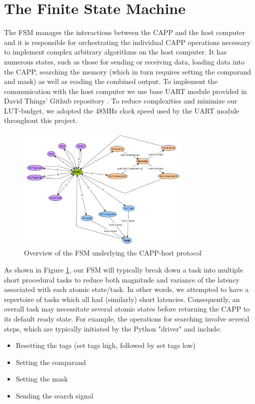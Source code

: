 \section{The Finite State Machine}
The FSM manages the interactions between the CAPP and the host computer and it is responsible for orchestrating the individual CAPP operations necessary to implement complex arbitrary algorithms on the host computer.
It has numerous states, such as those for sending or receiving data, loading data into the CAPP, searching the memory (which in turn requires setting the comparand and mask) as well as reading the combined output. To implement the communication with the host computer we use base UART module provided in David Things' Github repository \cite{uart}. To reduce complexities and minimize our LUT-budget, we adopted the 48MHz clock speed used by the UART module throughout this project. 

\begin{figure}
  \includegraphics[height=6cm]{FPGA-CAPP research paper/images/protocol.png}
  \caption{Overview of the FSM underlying the CAPP-host protocol}
  \label{FSM_protocol}
\end{figure}

As shown in Figure \ref{FSM_protocol}, our FSM will typically break down a task into multiple short procedural tasks to reduce both magnitude and variance of the latency associated with each atomic state/task. In other words, we attempted to have a repertoire of tasks which all had (similarly) short latencies. Consequently, an overall task may necessitate several atomic states before returning the CAPP to its default ready state. 
For example, the operations for searching involve several steps, which are typically initiated by the Python "driver" and include:

\begin{itemize}
    \item Resetting the tags (set tags high, followed by set tags low)
    \item Setting the comparand 
    \item Setting the mask 
    \item Sending the search signal 
\end{itemize}

